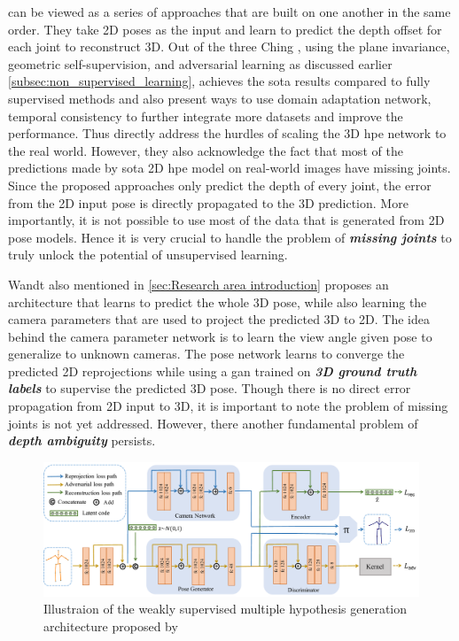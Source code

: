 \cite{unsupervisedAdversarial, can3dpose, amazon1} can be viewed as a series of approaches that are built on one another in the same order. They take 2D poses as the input and learn to predict the depth offset for each joint to reconstruct 3D. Out of the three Ching \etal \cite{amazon1}, using the plane invariance, geometric self-supervision, and adversarial learning as discussed earlier \ref{subsec:non_supervised_learning}, achieves the \ac{sota} results compared to fully supervised methods and also present ways to use domain adaptation network, temporal consistency to further integrate more datasets and improve the performance. Thus directly address the hurdles of scaling the 3D \ac{hpe} network to the real world. However, they also acknowledge the fact that most of the predictions made by \ac{sota} 2D \ac{hpe} model on real-world images have missing joints. Since the proposed approaches only predict the depth of every joint, the error from the 2D input pose is directly propagated to the 3D prediction. More importantly, it is not possible to use most of the data that is generated from 2D pose models. Hence it is very crucial to handle the problem of \textit{\textbf{missing joints}} to truly unlock the potential of unsupervised learning.

Wandt \etal \cite{repnet} also mentioned in \ref{sec:Research area introduction} proposes an architecture that learns to predict the whole 3D pose, while also learning the camera parameters that are used to project the predicted 3D to 2D. The idea behind the camera parameter network is to learn the view angle given pose to generalize to unknown cameras. The pose network learns to converge the predicted 2D reprojections while using a \ac{gan} trained on \textit{\textbf{3D ground truth labels}} to supervise the predicted 3D pose. Though there is no direct error propagation from 2D input to 3D, it is important to note the problem of missing joints is not yet addressed. However, there another fundamental problem of \textit{\textbf{depth ambiguity}} persists. 

\begin{figure}[h]
    \centering
    \includegraphics[width=\linewidth]{figures/background/multi_arch.pdf}
    \caption{Illustraion of the weakly supervised multiple hypothesis generation architecture proposed by \cite{weaklymultiple}}
    \label{fig:multi_arch}
\end{figure}


